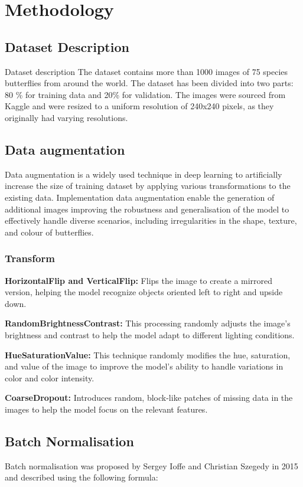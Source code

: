 \documentclass[10pt,twocolumn,letterpaper]{article}
\begin{document}
\section{Methodology}
\label{sec:related}

\subsection{Dataset Description}{Dataset description } The dataset contains more than 1000 images of 75 species butterflies from around the world. The dataset has been divided into two parts: 80
\% for training data and 20\% for validation. The images were sourced from Kaggle and were resized to a uniform resolution of 240x240 pixels, as they originally had varying resolutions.

\subsection{Data augmentation} Data augmentation is a widely used technique in deep learning to artificially increase the size of training dataset by applying various transformations to the existing data. Implementation data augmentation enable the generation of additional images improving the robustness and generalisation of the model to effectively handle diverse scenarios, including irregularities in the shape, texture, and colour of butterflies\cite{o2020deep}.\\
\subsubsection{Transform}

\textbf{HorizontalFlip and VerticalFlip:} Flips the image to create a mirrored version, helping the model recognize objects oriented left to right and upside down.

\textbf{RandomBrightnessContrast:} This processing randomly adjusts the image's brightness and contrast to help the model adapt to different lighting conditions.

\textbf{HueSaturationValue:} This technique randomly modifies the hue, saturation, and value of the image to improve the model's ability to handle variations in color and color intensity.

\textbf{CoarseDropout:} Introduces random, block-like patches of missing data in the images to help the model focus on the relevant features.

\subsection{Batch Normalisation} Batch normalisation was proposed by Sergey Ioffe and Christian Szegedy in 2015 and described using the following formula:
\end{document}

